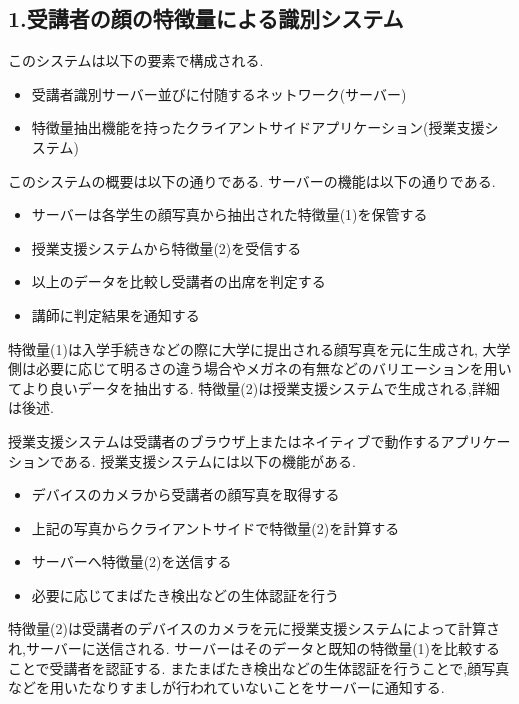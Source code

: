 \documentclass[uplatex,a4j,11pt,dvipdfmx]{jsarticle}
\begin{document}
\subsection*{1.受講者の顔の特徴量による識別システム}
このシステムは以下の要素で構成される.
\begin{itemize}
  \item 受講者識別サーバー並びに付随するネットワーク(サーバー)
  \item 特徴量抽出機能を持ったクライアントサイドアプリケーション(授業支援システム)
\end{itemize}
このシステムの概要は以下の通りである.
サーバーの機能は以下の通りである.
\begin{itemize}
  \item サーバーは各学生の顔写真から抽出された特徴量(1)を保管する
  \item 授業支援システムから特徴量(2)を受信する
  \item 以上のデータを比較し受講者の出席を判定する
  \item 講師に判定結果を通知する
\end{itemize}
特徴量(1)は入学手続きなどの際に大学に提出される顔写真を元に生成され,
大学側は必要に応じて明るさの違う場合やメガネの有無などのバリエーションを用いてより良いデータを抽出する.
特徴量(2)は授業支援システムで生成される,詳細は後述.

授業支援システムは受講者のブラウザ上またはネイティブで動作するアプリケーションである.
授業支援システムには以下の機能がある.
\begin{itemize}
  \item デバイスのカメラから受講者の顔写真を取得する
  \item 上記の写真からクライアントサイドで特徴量(2)を計算する
  \item サーバーへ特徴量(2)を送信する
  \item 必要に応じてまばたき検出などの生体認証を行う
\end{itemize}
特徴量(2)は受講者のデバイスのカメラを元に授業支援システムによって計算され,サーバーに送信される.
サーバーはそのデータと既知の特徴量(1)を比較することで受講者を認証する.
またまばたき検出などの生体認証を行うことで,顔写真などを用いたなりすましが行われていないことをサーバーに通知する.
\end{document}
